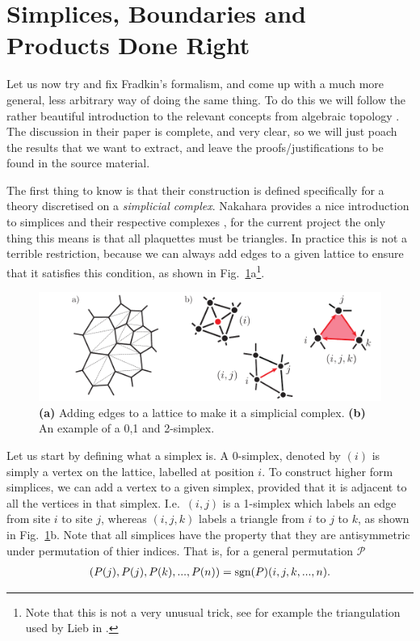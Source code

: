 \documentclass[11pt, oneside]{article} %
\numberwithin{equation}{section}
\begin{document}
\section{Simplices, Boundaries and Products Done Right}

Let us now try and fix Fradkin's formalism, and come up with a much more general, less arbitrary way of doing the same thing. To do this we will follow the rather beautiful introduction to the relevant concepts from algebraic topology \cite{schwalm_vector_1999}. The discussion in their paper is complete, and very clear, so we will just poach the results that we want to extract, and leave the proofs/justifications to be found in the source material. 

The first thing to know is that their construction is defined specifically for a theory discretised on a \textit{simplicial complex}. Nakahara provides a nice introduction to simplices and their respective complexes \cite{nakahara_geometry_2003}, for the current project the only thing this means is that all plaquettes must be triangles. In practice this is not a terrible restriction, because we can always add edges to a given lattice to ensure that it satisfies this condition, as shown in Fig.~\ref{fig:simplices}a\footnote{Note that this is not a very unusual trick, see for example the triangulation used by Lieb in \cite{lieb_fluxes_2004}.}. 

\begin{figure}
    \centering
    \includegraphics[width=1\linewidth]{figs/simplces.pdf}
    \caption{
    \textbf{(a)} Adding edges to a lattice to make it a simplicial complex.
    \textbf{(b)} An example of a 0,1 and 2-simplex.
    }
    \label{fig:simplices}
\end{figure}

Let us start by defining what a simplex is. A 0-simplex, denoted by $(i)$ is simply a vertex on the lattice, labelled at position $i$. To construct higher form simplices, we can add a vertex to a given simplex, provided that it is adjacent to all the vertices in that simplex. I.e.~$(i,j)$ is a 1-simplex which labels an edge from site $i$ to site $j$, whereas $(i,j,k)$ labels a triangle from $i$ to $j$ to $k$, as shown in Fig.~\ref{fig:simplices}b. Note that all simplices have the property that they are antisymmetric under permutation of thier indices. That is, for a general permutation $\mathcal P$
\begin{align}
    (P(j), P(j), P(k), ..., P(n)) = \textup{sgn}(P) (i,j,k,...,n).
\end{align}
\end{document}
